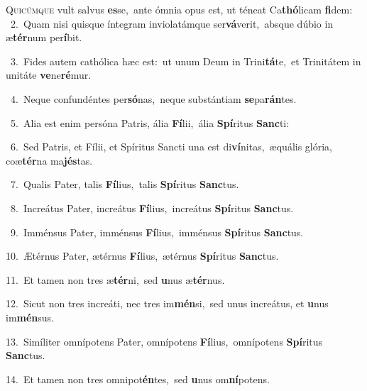 \lettrine{\initial\textcolor{\initialcolor}{Q}}{uicúmque} vult salvus \textbf{es}\-se,~\star ante ómnia opus est, ut téneat Ca\-\textbf{thó}\-licam \textbf{fi}\-dem:\\
{\numbfont\textcolor{\numbcolor}{~2.}}~Quam nisi quisque íntegram inviolatámque ser\-\textbf{vá}\-verit,~\star absque dúbio in æ\-\textbf{tér}\-num per\-\textbf{í}\-bit.\par
{\numbfont\textcolor{\numbcolor}{~3.}}~Fides autem cathólica hæc est:~\dagger ut unum Deum in Trini\-\textbf{tá}\-te,~\star et Trinitátem in unitáte \textbf{ve}\-ne\-\textbf{ré}\-mur.\par
{\numbfont\textcolor{\numbcolor}{~4.}}~Neque confundéntes per\-\textbf{só}\-nas,~\star neque substántiam \textbf{se}\-pa\-\textbf{rán}\-tes.\par
{\numbfont\textcolor{\numbcolor}{~5.}}~Alia est enim persóna Patris, ália \textbf{Fí}\-lii,~\star ália \textbf{Spí}\-ritus \textbf{Sanc}\-ti:\par
{\numbfont\textcolor{\numbcolor}{~6.}}~Sed Patris, et Fílii, et Spíritus Sancti una est di\-\textbf{ví}\-nitas,~\star æquális glória, coæ\-\textbf{tér}\-na ma\-\textbf{jés}\-tas.\par
{\numbfont\textcolor{\numbcolor}{~7.}}~Qualis Pater, talis \textbf{Fí}\-lius,~\star talis \textbf{Spí}\-ritus \textbf{Sanc}\-tus.\par
{\numbfont\textcolor{\numbcolor}{~8.}}~Increátus Pater, increátus \textbf{Fí}\-lius,~\star increátus \textbf{Spí}\-ritus \textbf{Sanc}\-tus.\par
{\numbfont\textcolor{\numbcolor}{~9.}}~Imménsus Pater, imménsus \textbf{Fí}\-lius,~\star imménsus \textbf{Spí}\-ritus \textbf{Sanc}\-tus.\par
{\numbfont\textcolor{\numbcolor}{10.}}~Ætérnus Pater, ætérnus \textbf{Fí}\-lius,~\star ætérnus \textbf{Spí}\-ritus \textbf{Sanc}\-tus.\par
{\numbfont\textcolor{\numbcolor}{11.}}~Et tamen non tres æ\-\textbf{tér}\-ni,~\star sed \textbf{u}\-nus æ\-\textbf{tér}\-nus.\par
{\numbfont\textcolor{\numbcolor}{12.}}~Sicut non tres increáti, nec tres im\-\textbf{mén}\-si,~\star sed unus increátus, et \textbf{u}\-nus im\-\textbf{mén}\-sus.\par
{\numbfont\textcolor{\numbcolor}{13.}}~Simíliter omnípotens Pater, omnípotens \textbf{Fí}\-lius,~\star omnípotens \textbf{Spí}\-ritus \textbf{Sanc}\-tus.\par
{\numbfont\textcolor{\numbcolor}{14.}}~Et tamen non tres omnipot\-\textbf{én}\-tes,~\star sed \textbf{u}\-nus om\-\textbf{ní}\-potens.\par
